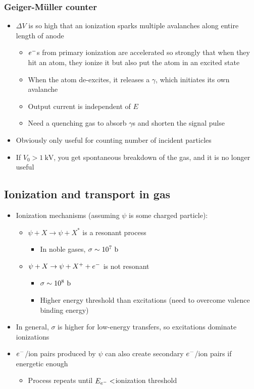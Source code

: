 \subsubsection{Geiger-M\"uller counter}
\begin{itemize}
  \item $\Delta V$ is so high that an ionization sparks multiple avalanches along entire length of anode
  \begin{itemize}
    \item $e^{-}$s from primary ionization are accelerated so strongly that when they hit an atom, they ionize it but also put the atom in an excited state
    \item When the atom de-excites, it releases a $\gamma$, which initiates its own avalanche
    \item Output current is independent of $E$
    \item Need a quenching gas to absorb $\gamma$s and shorten the signal pulse
  \end{itemize}
  \item Obviously only useful for counting number of incident particles
  \item If $V_0 > 1~\text{kV}$, you get spontaneous breakdown of the gas, and it is no longer useful
\end{itemize}

\subsection{Ionization and transport in gas}
\begin{itemize}
  \item Ionization mechanisms (assuming $\psi$ is some charged particle):
  \begin{itemize}
    \item $\psi+X\rightarrow\psi+X^*$ is a resonant process
    \begin{itemize}
      \item In noble gases, $\sigma\sim 10^7~\text{b}$
    \end{itemize}
    \item $\psi+X \rightarrow \psi+X^++e^{-}$ is not resonant
    \begin{itemize}
      \item $\sigma\sim 10^8~\text{b}$
      \item Higher energy threshold than excitations (need to overcome valence binding energy)
    \end{itemize}
  \end{itemize}
  \item In general, $\sigma$ is higher for low-energy transfers, so excitations dominate ionizations
  \item $e^{-}$/ion pairs produced by $\psi$ can also create secondary $e^{-}$/ion pairs if energetic enough
  \begin{itemize}
    \item Process repeats until $E_{e^{-}}<$ionization threshold
  \end{itemize}
\end{itemize}
